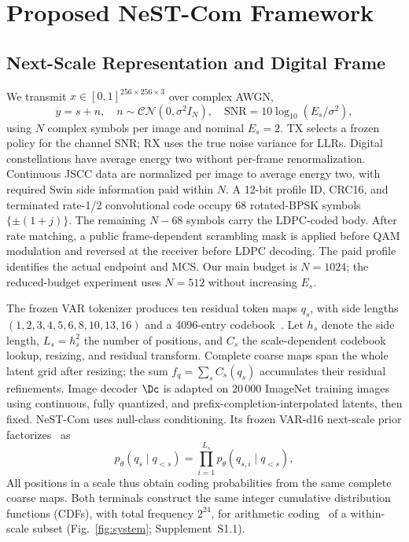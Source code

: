 \section{Proposed NeST-Com Framework}
\subsection{Next-Scale Representation and Digital Frame}
We transmit $x\in[0,1]^{256\times256\times3}$ over complex AWGN,
\begin{equation}
 y=s+n,\quad n\sim\mathcal{CN}(0,\sigma^2 I_N),\quad
 \mathrm{SNR}=10\log_{10}(E_s/\sigma^2),
 \label{eq:channel}
\end{equation}
using $N$ complex symbols per image and nominal $E_s=2$. TX selects a frozen policy for the channel SNR; RX uses the true noise variance for LLRs. Digital constellations have average energy two without per-frame renormalization. Continuous JSCC data are normalized per image to average energy two, with required Swin side information paid within $N$. A 12-bit profile ID, CRC16, and terminated rate-1/2 convolutional code occupy 68 rotated-BPSK symbols $\{\pm(1+j)\}$. The remaining $N-68$ symbols carry the LDPC-coded body. After rate matching, a public frame-dependent scrambling mask is applied before QAM modulation and reversed at the receiver before LDPC decoding. The paid profile identifies the actual endpoint and MCS. Our main budget is $N=1024$; the reduced-budget experiment uses $N=512$ without increasing $E_s$.

The frozen VAR tokenizer produces ten residual token maps $q_s$, with side lengths $(1,2,3,4,5,6,8,10,13,16)$ and a 4096-entry codebook~\cite{var}. Let $h_s$ denote the side length, $L_s=h_s^2$ the number of positions, and $C_s$ the scale-dependent codebook lookup, resizing, and residual transform. Complete coarse maps span the whole latent grid after resizing; the sum $f_q=\sum_s C_s(q_s)$ accumulates their residual refinements. Image decoder $\Dc$ is adapted on 20\,000 ImageNet training images using continuous, fully quantized, and prefix-completion-interpolated latents, then fixed. NeST-Com uses null-class conditioning. Its frozen VAR-d16 next-scale prior factorizes~\cite{var} as
\begin{equation}
 p_\theta(q_s\mid q_{<s})=\prod_{i=1}^{L_s}p_\theta(q_{s,i}\mid q_{<s}),
 \label{eq:prior}
\end{equation}
All positions in a scale thus obtain coding probabilities from the same complete coarse maps. Both terminals construct the same integer cumulative distribution functions (CDFs), with total frequency $2^{24}$, for arithmetic coding~\cite{arithmetic} of a within-scale subset (Fig.~\ref{fig:system}; Supplement~S1.1).

